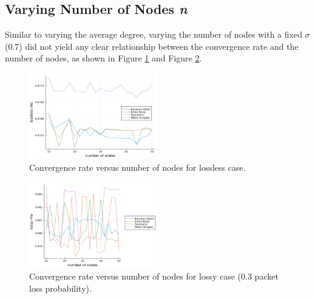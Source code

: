 \documentclass[conference]{IEEEtran}
\begin{document}
\subsection{Varying Number of Nodes \textit{n}}
Similar to varying the average degree, varying the number of nodes with a fixed $\sigma$ (0.7) did not yield any clear relationship between the convergence rate and the number of nodes, as shown in Figure \ref{fig:n_lossless} and Figure \ref{fig:n_lossy}.
\begin {figure}[h]
    \centering
    \includegraphics[width=0.5\textwidth]{4types.png}
    \caption{Convergence rate versus number of nodes for lossless case.}
    \label{fig:n_lossless}
\end{figure}
\begin {figure}[h]
    \centering
    \includegraphics[width=0.5\textwidth]{4typeslossy.png}
    \caption{Convergence rate versus number of nodes for lossy case (0.3 packet loss probability).}
    \label{fig:n_lossy}
\end{figure}
\end{document}
